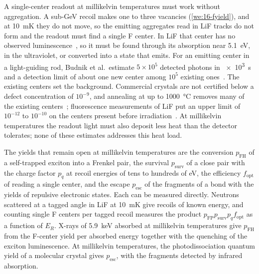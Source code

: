 A single-center readout at millikelvin temperatures must work without aggregation. A sub-GeV recoil makes one to three vacancies (\cref{we:16-fyield}), and at \SI{10}{mK} they do not move, so the emitting aggregates read in LiF tracks do not form and the readout must find a single F center. In LiF that center has no observed luminescence~\cite{guerreroperez2025first}, so it must be found through its absorption near \SI{5.1}{eV}, in the ultraviolet, or converted into a state that emits. For an emitting center in a light-guiding rod, Budnik et al.\ estimate $5\times10^5$ detected photons in \SI{e3}{s} and a detection limit of about one new center among $10^5$ existing ones~\cite[footnote~1]{budnik2018direct}. The existing centers set the background. Commercial crystals are not certified below a defect concentration of $10^{-9}$, and annealing at up to \SI{1000}{\celsius} removes many of the existing centers~\cite{budnik2018direct}; fluorescence measurements of LiF put an upper limit of $10^{-12}$ to $10^{-10}$ on the centers present before irradiation~\cite{cogswell2021passive}. At millikelvin temperatures the readout light must also deposit less heat than the detector tolerates; none of these estimates addresses this heat load.

The yields that remain open at millikelvin temperatures are the conversion $p_{\mathrm{FH}}$ of a self-trapped exciton into a Frenkel pair, the survival $p_{\mathrm{surv}}$ of a close pair with the charge factor $p_q$ at recoil energies of tens to hundreds of eV, the efficiency $f_{\mathrm{opt}}$ of reading a single center, and the escape $p_{\mathrm{esc}}$ of the fragments of a bond with the yields of repulsive electronic states. Each can be measured directly. Neutrons scattered at a tagged angle in LiF at \SI{10}{mK} give recoils of known energy, and counting single F centers per tagged recoil measures the product $p_{\mathrm{FP}}p_{\mathrm{surv}}p_qf_{\mathrm{opt}}$ as a function of $E_R$. X-rays of \SI{5.9}{keV} absorbed at millikelvin temperatures give $p_{\mathrm{FH}}$ from the F-center yield per absorbed energy together with the quenching of the exciton luminescence. At millikelvin temperatures, the photodissociation quantum yield of a molecular crystal gives $p_{\mathrm{esc}}$, with the fragments detected by infrared absorption.
